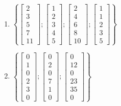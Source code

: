 \begin{enumerate}
\item
$\left\{\left[ \begin{array}{c} 2 \\ 3 \\ 5 \\ 7 \\ 11 \end{array} \right] ;
\left[ \begin{array}{c} 1 \\ 2 \\ 3 \\ 4 \\5 \end{array} \right] ;
\left[ \begin{array}{c} 2 \\ 4 \\ 6 \\ 8 \\ 10 \end{array} \right] ; 
\left[ \begin{array}{c} 1 \\ 1 \\ 2 \\ 3 \\ 5 \end{array} \right] \right\} $

\item
$\left\{\left[ \begin{array}{c} 0 \\ 1 \\ 0\\ 2 \\ 3 \\ 0 \end{array} \right] ;
\left[ \begin{array}{c} 0 \\ 2 \\ 0\\ 7 \\ 1 \\ 0 \end{array} \right] ;
\left[ \begin{array}{c} 0 \\ 12 \\ 0\\ 23 \\ 35 \\ 0 \end{array} \right] \right\}$



\end{enumerate}
